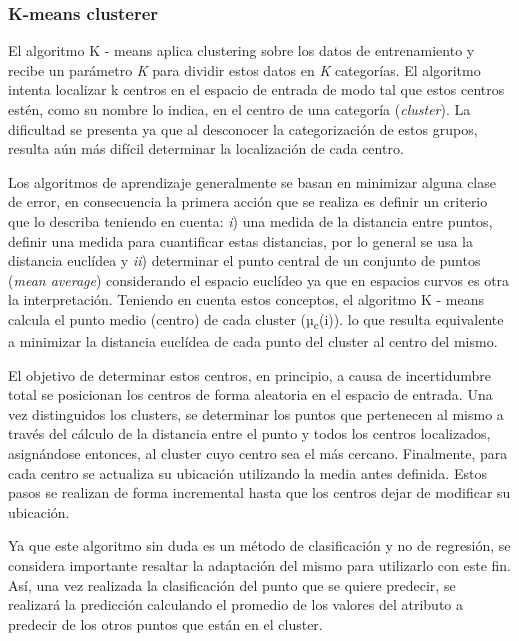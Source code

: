 \subsubsection{K-means clusterer}

El algoritmo K - means aplica clustering sobre los datos de entrenamiento
y recibe un parámetro \emph{K} para dividir estos datos en \emph{K}
categorías. El algoritmo intenta localizar k centros en el espacio
de entrada de modo tal que estos centros estén, como su nombre lo
indica, en el centro de una categoría (\emph{cluster}). La dificultad
se presenta ya que al desconocer la categorización de estos grupos,
resulta aún más difícil determinar la localización de cada centro. 

Los algoritmos de aprendizaje generalmente se basan en minimizar alguna
clase de error, en consecuencia la primera acción que se realiza es
definir un criterio que lo describa teniendo en cuenta: \emph{i})
una medida de la distancia entre puntos, definir una medida para cuantificar
estas distancias, por lo general se usa la distancia euclídea y \emph{ii})
determinar el punto central de un conjunto de puntos (\emph{mean average})
considerando el espacio euclídeo ya que en espacios curvos es otra
la interpretación. Teniendo en cuenta estos conceptos, el algoritmo
K - means calcula el punto medio (centro) de cada cluster (µ\textsubscript{c}(i)).
lo que resulta equivalente a minimizar la distancia euclídea de cada
punto del cluster al centro del mismo. 

El objetivo de determinar estos centros, en principio, a causa de
incertidumbre total se posicionan los centros de forma aleatoria en
el espacio de entrada. Una vez distinguidos los clusters, se determinar
los puntos que pertenecen al mismo a través del cálculo de la distancia
entre el punto y todos los centros localizados, asignándose entonces,
al cluster cuyo centro sea el más cercano. Finalmente, para cada centro
se actualiza su ubicación utilizando la media antes definida. Estos
pasos se realizan de forma incremental hasta que los centros dejar
de modificar su ubicación. 

Ya que este algoritmo sin duda es un método de clasificación y no
de regresión, se considera importante resaltar la adaptación del mismo
para utilizarlo con este fin. Así, una vez realizada la clasificación
del punto que se quiere predecir, se realizará la predicción calculando
el promedio de los valores del atributo a predecir de los otros puntos
que están en el cluster. 


